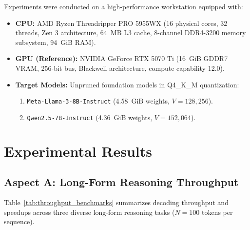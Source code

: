 \documentclass[journal,10pt,twocolumn]{article}
\theoremstyle{definition}
\begin{document}
Experiments were conducted on a high-performance workstation equipped with:
\begin{itemize}
    \item \textbf{CPU:} AMD Ryzen Threadripper PRO 5955WX (16 physical cores, 32 threads, Zen 3 architecture, 64~MB L3 cache, 8-channel DDR4-3200 memory subsystem, 94~GiB RAM).
    \item \textbf{GPU (Reference):} NVIDIA GeForce RTX 5070 Ti (16~GiB GDDR7 VRAM, 256-bit bus, Blackwell architecture, compute capability 12.0).
    \item \textbf{Target Models:} Unpruned foundation models in Q4\_K\_M quantization:
    \begin{enumerate}
        \item \texttt{Meta-Llama-3-8B-Instruct} (4.58~GiB weights, $V=128,256$).
        \item \texttt{Qwen2.5-7B-Instruct} (4.36~GiB weights, $V=152,064$).
    \end{enumerate}
\end{itemize}

\section{Experimental Results}

\subsection{Aspect A: Long-Form Reasoning Throughput}

Table~\ref{tab:throughput_benchmarks} summarizes decoding throughput and speedups across three diverse long-form reasoning tasks ($N=100$ tokens per sequence).

\begin{table}[ht]
\centering
{}
\caption{Throughput and Speedup on Long Reasoning Tasks.}
\label{tab:throughput_benchmarks}
\end{table}
\end{document}
